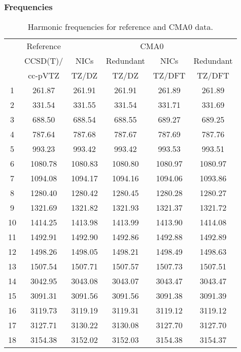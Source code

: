 \documentclass[10pt,oneside]{article}
\begin{document}
\begin{table}[h!]
\subsubsection*{Frequencies}
\centering
\caption{Harmonic frequencies for reference and CMA0 data.}
\begin{tabular}{cccccc}
\toprule
{} & Reference & \multicolumn{4}{c}{CMA0} \\
{} &  CCSD(T)/ &    NICs &  Redundant &    NICs & Redundant \\
{} &   cc-pVTZ &   TZ/DZ &      TZ/DZ &  TZ/DFT &    TZ/DFT \\
\midrule
1  &    261.87 &  261.91 &     261.91 &  261.89 &    261.89 \\
2  &    331.54 &  331.55 &     331.54 &  331.71 &    331.69 \\
3  &    688.50 &  688.54 &     688.55 &  689.27 &    689.25 \\
4  &    787.64 &  787.68 &     787.67 &  787.69 &    787.76 \\
5  &    993.23 &  993.42 &     993.42 &  993.53 &    993.51 \\
6  &   1080.78 & 1080.83 &    1080.80 & 1080.97 &   1080.97 \\
7  &   1094.08 & 1094.17 &    1094.16 & 1094.06 &   1093.86 \\
8  &   1280.40 & 1280.42 &    1280.45 & 1280.28 &   1280.27 \\
9  &   1321.69 & 1321.82 &    1321.93 & 1321.37 &   1321.72 \\
10 &   1414.25 & 1413.98 &    1413.99 & 1413.90 &   1414.08 \\
11 &   1492.91 & 1492.90 &    1492.86 & 1492.88 &   1492.89 \\
12 &   1498.26 & 1498.05 &    1498.21 & 1498.49 &   1498.63 \\
13 &   1507.54 & 1507.71 &    1507.57 & 1507.73 &   1507.51 \\
14 &   3042.95 & 3043.08 &    3043.07 & 3043.47 &   3043.47 \\
15 &   3091.31 & 3091.56 &    3091.56 & 3091.38 &   3091.39 \\
16 &   3119.73 & 3119.19 &    3119.31 & 3119.12 &   3119.12 \\
17 &   3127.71 & 3130.22 &    3130.08 & 3127.70 &   3127.70 \\
18 &   3154.38 & 3152.02 &    3152.03 & 3154.38 &   3154.37 \\
\bottomrule
\end{tabular}
\end{table}
\end{document}
